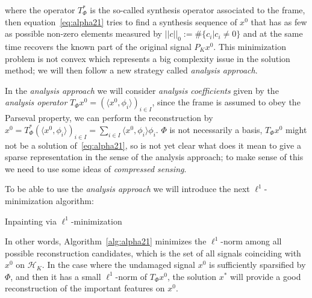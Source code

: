 where the operator $T^*_{\Phi}$ is the so-called synthesis operator associated to the frame, then equation~\ref{eq:alpha21} tries to find a synthesis sequence of $x^0$ that has as few as possible non-zero elements measured by $||c||_0:=\#\{c_i|c_i\neq 0\}$ and at the same time recovers the known part of the original signal $P_Kx^0$. This minimization problem is not convex which represents a big complexity issue in the solution method; we will then follow a new strategy called \textit{analysis approach}.

\bigskip

In the \textit{analysis approach} we will consider \textit{analysis coefficients} given by the \textit{analysis operator} $T_{\Phi}x^0=(\langle x^0,\phi_i\rangle)_{i\in I}$, since the frame is assumed to obey the Parseval property, we can perform the reconstruction by $x^0=T^*_{\Phi}(\langle x^0,\phi_i\rangle)_{i\in I}=\sum_{i\in I}\langle x^0,\phi_i\rangle\phi_i$. $\Phi$ is not necessarily a basis, $T_{\Phi}x^0$ might not be a solution of~\ref{eq:alpha21}, so is not yet clear what does it mean to give a sparse representation in the sense of the analysis approach; to make sense of this we need to use some ideas of \textit{compressed sensing}.

\bigskip

To be able to use the \textit{analysis approach} we will introduce the next $\ell^1$-minimization algorithm:

\bigskip

\begin{algorithm}[h!]

    \caption{Inpainting via $\ell^1$-minimization}
		\label{alg:alpha21}
\end{algorithm}

\bigskip

In other words, Algorithm~\ref{alg:alpha21} minimizes the $\ell^1$-norm among all possible reconstruction candidates, which is the set of all signals coinciding with $x^0$ on $\mathcal{H}_K$. In the case where the undamaged signal $x^0$ is sufficiently sparsified by $\Phi$, and then it has a small $\ell^1$-norm of $T_{\Phi}x^0$, the solution $x^*$ will provide a good reconstruction of the important features on $x^0$.

